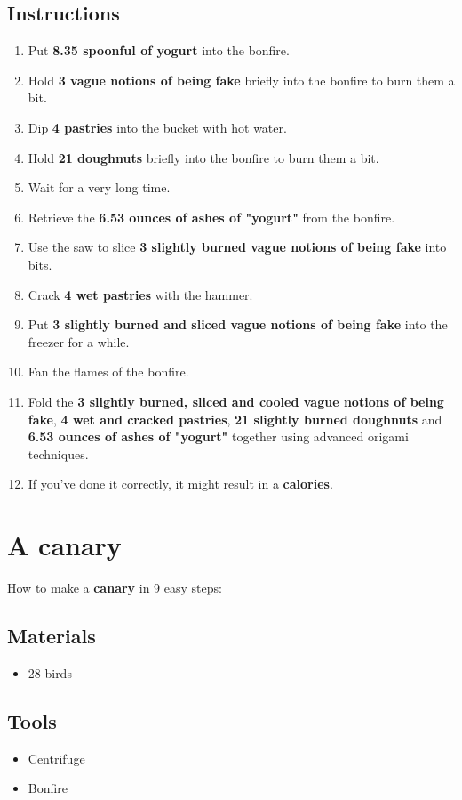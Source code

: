 \documentclass{article}
\begin{document}
\subsection{Instructions}\begin{enumerate}
\item 
Put \textbf{8.35 spoonful of yogurt} into the bonfire.
\item 
Hold \textbf{3 vague notions of being fake} briefly into the bonfire to burn them a bit.
\item 
Dip \textbf{4 pastries} into the bucket with hot water.
\item 
Hold \textbf{21 doughnuts} briefly into the bonfire to burn them a bit.
\item 
Wait for a very long time.
\item 
Retrieve the \textbf{6.53 ounces of ashes of "yogurt"} from the bonfire.
\item 
Use the saw to slice \textbf{3 slightly burned vague notions of being fake} into bits.
\item 
Crack \textbf{4 wet pastries} with the hammer.
\item 
Put \textbf{3 slightly burned and sliced vague notions of being fake} into the freezer for a while.
\item 
Fan the flames of the bonfire.
\item 
Fold the \textbf{3 slightly burned, sliced and cooled vague notions of being fake}, \textbf{4 wet and cracked pastries}, \textbf{21 slightly burned doughnuts} and \textbf{6.53 ounces of ashes of "yogurt"} together using advanced origami techniques.
\item 
If you've done it correctly, it might result in a \textbf{calories}.
\end{enumerate}
\newpage
\section{A canary}How to make a \textbf{canary} in 9 easy steps:

\subsection{Materials}\begin{itemize}
\item 
28 birds
\end{itemize}
\subsection{Tools}\begin{itemize}
\item 
Centrifuge
\item 
Bonfire
\end{itemize}
\end{document}
